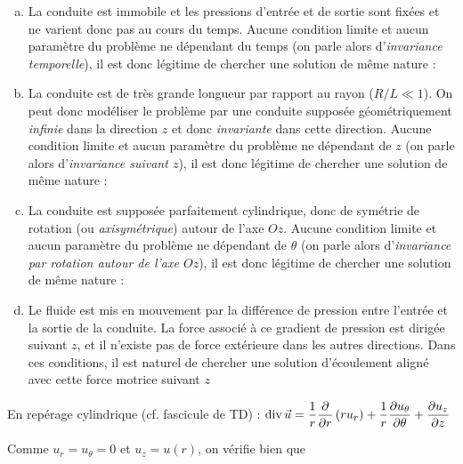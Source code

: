 \documentclass[10pt, a4paper]{article}
\renewcommand{\myvec}[1]{\vec{#1}}
\begin{document}
\begin{myenumerate}
\item 
\begin{enumerate}[a)]
\item 
  La conduite est immobile et les pressions d'entrée et de sortie sont fixées 
  et ne varient donc pas au cours du temps.
  Aucune condition limite et aucun paramètre du problème ne dépendant du temps
  (on parle alors d'\textsl{invariance temporelle}),
  il est donc légitime de chercher une solution de même nature :
  \dotfill \fbox{$\myvec{u} = \myvec{u}(r, \theta, z)$}
\item 
	La conduite est de très grande longueur par rapport au rayon ($R/L \ll 1$).
	On peut donc modéliser le problème par une conduite supposée géométriquement
	\textsl{infinie} dans la direction $z$ et donc \textsl{invariante}
	dans cette direction.
  Aucune condition limite et aucun paramètre du problème ne dépendant de $z$
  (on parle alors d'\textsl{invariance suivant $z$}),
  il est donc légitime de chercher une solution de même nature :
  \dotfill \fbox{$\myvec{u} = \myvec{u}(r, \theta)$}
\item
	La conduite est supposée parfaitement cylindrique, 
	donc de symétrie de rotation (ou \textsl{axisymétrique}) 
	autour de l'axe $Oz$.
  Aucune condition limite et aucun paramètre du problème ne dépendant de $\theta$
  (on parle alors d'\textsl{invariance par rotation autour de l'axe $Oz$}),
  il est donc légitime de chercher une solution de même nature :
  \dotfill \fbox{$\myvec{u} = \myvec{u}(r)$}
\item 
	Le fluide est mis en mouvement par la différence de pression entre l'entrée et la sortie
	de la conduite. La force associé à ce gradient de pression est dirigée suivant $z$,
	et il n'existe pas de force extérieure dans les autres directions.
	Dans ces conditions, il est naturel de chercher une solution d'écoulement aligné
	avec cette force motrice suivant $z$ 
  \dotfill \fbox{$\myvec{u} = u(r) \, \ez$}
\end{enumerate}
\item
En repérage cylindrique (cf. fascicule de TD) :
$\divergence \myvec{u}
= \dfrac{1}{r} \dpdr{}\left (r u_r \right) + \dfrac{1}{r} \dpdtheta{u_{\theta}} + \dpdz{u_z}$

Comme $u_r = u_\theta = 0$ et $u_z = u(r)$, on vérifie bien que
\dotfill
\fbox{$\divergence \myvec{u} = 0$}


\end{myenumerate}
\end{document}
